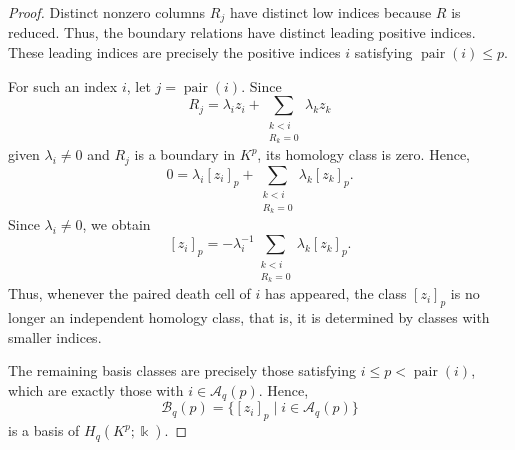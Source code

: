 \documentclass[10pt,a4paper]{amsart}
\newcommand{\R}{\mathbb{R}}
\begin{document}
\begin{proof}
Distinct nonzero columns $R_j$ have distinct low indices because $R$ is reduced. Thus, the boundary relations have distinct leading positive indices. These leading indices are precisely the positive indices $i$ satisfying $\operatorname{pair}(i)\leq p$.

For such an index $i$, let $j=\operatorname{pair}(i)$. Since
\[
R_j = \lambda_i z_i + \sum_{\substack{k<i\\R_k=0}} \lambda_k z_k
\]
given $\lambda_i \neq 0$ and $R_j$ is a boundary in $K^p$, its homology class is zero. Hence,
\[
0 = \lambda_i[z_i]_p + \sum_{\substack{k<i\\R_k=0}}\lambda_k[z_k]_p.
\]
Since $\lambda_i\neq0$, we obtain
\[
[z_i]_p = -\lambda_i^{-1}\sum_{\substack{k<i\\R_k=0}}\lambda_k[z_k]_p.
\]
Thus, whenever the paired death cell of $i$ has appeared, the class $[z_i]_p$ is no longer an independent homology class, that is, it is determined by classes with smaller indices.

The remaining basis classes are precisely those satisfying $i\leq p<\operatorname{pair}(i)$, which are exactly those with $i\in\mathcal A_q(p)$. Hence,
\[
\mathcal B_q(p) = \{[z_i]_p\mid i\in\mathcal A_q(p)\}
\]
is a basis of $H_q(K^p;\Bbbk)$.
\end{proof}
\end{document}
